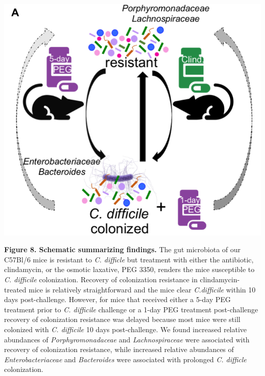 \documentclass[
  11pt,
]{article}
\begin{document}
\includegraphics{figure_8.pdf}

\textbf{Figure 8. Schematic summarizing findings.} The gut microbiota of
our C57Bl/6 mice is resistant to \emph{C. difficle} but treatment with
either the antibiotic, clindamycin, or the osmotic laxative, PEG 3350,
renders the mice susceptible to \emph{C. difficile} colonization.
Recovery of colonization resistance in clindamycin-treated mice is
relatively straightforward and the mice clear \emph{C.difficile} within
10 days post-challenge. However, for mice that received either a 5-day
PEG treatment prior to \emph{C. difficile} challenge or a 1-day PEG
treatment post-challenge recovery of colonization resistance was delayed
because most mice were still colonized with \emph{C. difficile} 10 days
post-challenge. We found increased relative abundances of
\emph{Porphyromonadaceae} and \emph{Lachnospiraceae} were associated
with recovery of colonization resistance, while increased relative
abundances of \emph{Enterobacteriaceae} and \emph{Bacteroides} were
associated with prolonged \emph{C. difficle} colonization. \newpage
\end{document}
